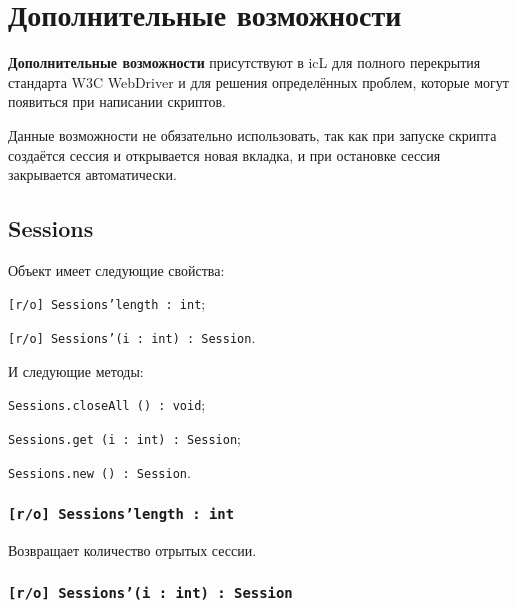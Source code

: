 

\section{Дополнительные возможности}

{\bf Дополнительные возможности} присутствуют в icL для полного перекрытия стандарта W3C WebDriver и для решения определённых проблем, которые могут появиться при написании скриптов.

Данные возможности не обязательно использовать, так как при запуске скрипта создаётся сессия и открывается новая вкладка, и при остановке сессия закрывается автоматически.


\subsection{{\color{orange} Sessions}}

Объект \sessions{} имеет следующие свойства:
\begin{icItems}
	\item \texttt{[r/o] Sessions'length : int};
	\item \texttt{[r/o] Sessions'(i : int) : Session}.
\end{icItems}

И следующие методы:
\begin{icItems}
	\item \texttt{Sessions.closeAll () : void};
	\item \texttt{Sessions.get (i : int) : Session};
	\item \texttt{Sessions.new () : Session}.
\end{icItems}

\subsubsection{\texttt{[r/o] Sessions'length : int}}

Возвращает количество отрытых сессии.

\subsubsection{\texttt{[r/o] Sessions'(i : int) : Session}}


